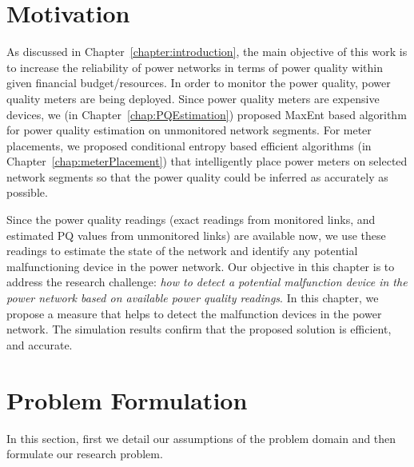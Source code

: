 \newcommand{\defeq}{\buildrel {\text{ def }}\over =}
\label{chap:predictionModel}
\section{Motivation}
As discussed in Chapter~\ref{chapter:introduction}, the main objective of this work is to increase the reliability of power networks in terms of power quality within given financial budget/resources. In order to monitor the power quality, power quality meters are being deployed. Since power quality meters are expensive devices, we (in Chapter~\ref{chap:PQEstimation}) proposed MaxEnt based algorithm for power quality estimation on unmonitored network segments. For meter placements, we proposed conditional entropy based efficient algorithms (in Chapter~\ref{chap:meterPlacement}) that intelligently place power meters on selected network segments so that the power quality could be inferred as accurately as possible.

Since the power quality readings (exact readings from monitored links, and estimated PQ values from unmonitored links) are available now, we use these readings to estimate the state of the network and identify any potential malfunctioning device in the power network. Our objective in this chapter is to address the research challenge: \textit{how to detect a potential malfunction device in the power network based on available power quality readings}. In this chapter, we propose a measure that helps to detect the malfunction devices in the power network. The simulation results confirm that the proposed solution is efficient, and accurate.

\section{Problem Formulation}
In this section, first we detail our assumptions of the problem domain and then formulate our research problem.

